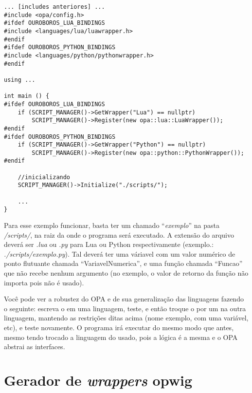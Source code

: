 \begin{lstlisting}
... [includes anteriores] ...
#include <opa/config.h>
#ifdef OUROBOROS_LUA_BINDINGS
#include <languages/lua/luawrapper.h>
#endif
#ifdef OUROBOROS_PYTHON_BINDINGS
#include <languages/python/pythonwrapper.h>
#endif

using ...

int main () {
#ifdef OUROBOROS_LUA_BINDINGS
    if (SCRIPT_MANAGER()->GetWrapper("Lua") == nullptr)
        SCRIPT_MANAGER()->Register(new opa::lua::LuaWrapper());    
#endif
#ifdef OUROBOROS_PYTHON_BINDINGS
    if (SCRIPT_MANAGER()->GetWrapper("Python") == nullptr)
        SCRIPT_MANAGER()->Register(new opa::python::PythonWrapper());
#endif

    //inicializando
    SCRIPT_MANAGER()->Initialize("./scripts/");
    
    ...
}
\end{lstlisting}

Para esse exemplo funcionar, basta ter um \script{} chamado ``\textit{exemplo}''
na pasta \textit{/scripts/}, na raiz da onde o programa será executado. A extensão
do arquivo deverá ser \textit{.lua} ou \textit{.py} para Lua ou Python respectivamente
(exemplo.: \textit{./scripts/exemplo.py}). Tal \script{} deverá ter uma váriavel
com um valor numérico de ponto flutuante chamada ``VariavelNumerica'', e uma função
chamada ``Funcao'' que não recebe nenhum argumento (no exemplo, o valor de retorno da
função não importa pois não é usado).

Você pode ver a robustez do OPA e de sua generalização das linguagens fazendo o seguinte:
escreva o \script{} em uma linguagem, teste, e então troque o \script{} por um na
outra linguagem, mantendo as restrições ditas acima (nome exemplo,  com uma variável, etc),
e teste novamente. O programa irá executar do mesmo modo que antes, mesmo tendo trocado a
linguagem do \script{} usado, pois a lógica é a mesma e o OPA abstrai as interfaces.


\section{Gerador de \emph{wrappers} \textbf{opwig}}
\label{sec:resultados:opwig}

